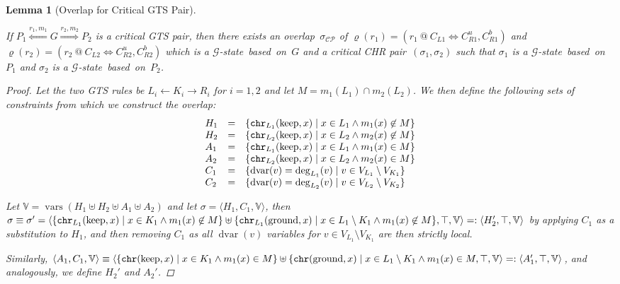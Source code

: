 \documentclass{tlp}
\newtheorem{lemma}[theorem]{Lemma}
\newcommand{\st}[3]{\ensuremath{\langle #1 , #2 , #3 \rangle}}
\newcommand{\mcCP}{\ensuremath{\mathcal{CP}}}
\newcommand{\mcG}{\ensuremath{\mathcal{G}}}
\newcommand{\bbV}{\ensuremath{\mathbb{V}}}
\DeclareMathOperator{\vars}{vars}
\DeclareMathOperator{\dvar}{dvar}
\DeclareMathOperator{\gnd}{ground}
\DeclareMathOperator{\kp}{keep}
\newcommand{\chr}{\ensuremath{{\tt chr}}}
\newcommand{\chrrule}{\ensuremath{\varrho}}
\begin{document}
\begin{lemma}[Overlap for Critical GTS Pair]\label{lem:cp_gts_chr}

If $P_1 \stackrel{r_1,m_1}{\Longleftarrow} G \stackrel{r_2,m_2}{\Longrightarrow}
P_2$ is a critical GTS pair, then there exists an overlap~$\sigma_{\mcCP}$
of $\chrrule(r_1) = (r_1\ @\ C_{L1} \Leftrightarrow C_{R1}^u,C_{R1}^b)$ and
$\chrrule(r_2) = (r_2\ @\ C_{L2} \Leftrightarrow C_{R2}^u,C_{R2}^b)$ which is a
\mcG-state~based~on~$G$ and a critical CHR pair~$(\sigma_1, \sigma_2)$ such that
$\sigma_1$ is a \mcG-state~based~on~$P_1$ and $\sigma_2$ is a
\mcG-state~based~on~$P_2$.

\begin{proof}

Let the two GTS rules be $L_i \leftarrow K_i \rightarrow R_i$ for $i=1,2$ and let
$M = m_1(L_1) \cap m_2(L_2)$. We then define the following sets of constraints
from which we construct the overlap: \[
\begin{array}{lcl}
H_1 & = & \{\chr_{L_1}(\kp, x) \mid x \in L_1 \land m_1(x) \not \in M \}\\
H_2 & = & \{\chr_{L_2}(\kp, x) \mid x \in L_2 \land m_2(x) \not \in M \} \\
A_1 & = & \{\chr_{L_1}(\kp, x) \mid x \in L_1 \land m_1(x) \in M \} \\
A_2 & = & \{\chr_{L_2}(\kp, x) \mid x \in L_2 \land m_2(x) \in M \}\\
C_1 & = & \{\dvar(v) = \deg_{L_1}(v) \mid v \in V_{L_1} \setminus V_{K_1}\}\\
C_2 & = & \{\dvar(v) = \deg_{L_2}(v) \mid v \in V_{L_2} \setminus V_{K_2}\}
\end{array}
\]

Let $\bbV = \vars(H_1 \uplus H_2 \uplus A_1 \uplus A_2)$ and let $\sigma =
\st{H_1}{C_1}{\bbV}$, then $\sigma \equiv \sigma' = \st{\{\chr_{L_1}(\kp,x) \mid
x \in K_1 \land m_1(x) \not \in M\} \uplus \{\chr_{L_1}(\gnd,x) \mid x \in L_1
\setminus K_1 \land m_1(x) \not \in M\}}{\top}{\bbV} =: \st{H_2'}{\top}{\bbV}$ by
applying $C_1$ as a substitution to $H_1$, and then removing $C_1$ as all
$\dvar(v)$ variables for $v \in V_{L_1} \setminus V_{K_1}$ are then strictly
local.

Similarly, $\st{A_1}{C_1}{\bbV} \equiv \st{\{\chr(\kp,x) \mid x \in K_1 \land
m_1(x) \in M\} \uplus \{\chr(\gnd,x) \mid x \in L_1 \setminus K_1 \land m_1(x)
\in M}{\top}{\bbV} =: \st{A_1'}{\top}{\bbV}$, and analogously, we define $H_2'$
and $A_2'$.


\end{proof}
\end{lemma}
\end{document}
